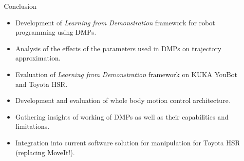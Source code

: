 \documentclass{beamer}
\begin{document}
	\begin{frame}{Conclusion}
	\begin{itemize}
		\item Development of \textit{Learning from Demonstration} framework for robot programming using DMPs.
		\item Analysis of the effects of the parameters used in DMPs on trajectory approximation. 
		\item Evaluation of \textit{Learning from Demonstration} framework on KUKA YouBot and Toyota HSR. 
		\item Development and evaluation of whole body motion control architecture.
		\item Gathering insights of working of DMPs as well as their capabilities and limitations. 
		\item Integration into current software solution for manipulation for Toyota HSR (replacing MoveIt!).
	  	\end{itemize}
	\end{frame}
\end{document}
